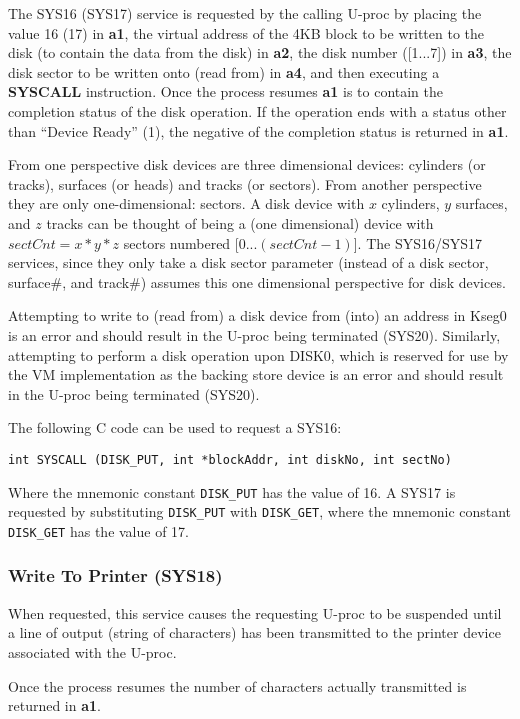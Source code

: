 The SYS16 (SYS17) service is requested by the calling U-proc by placing the value 16 (17) in \textbf{a1}, the virtual address of the 4KB block to be written to the disk (to contain the data from the disk) in \textbf{a2}, the disk number ([1...7]) in \textbf{a3}, the disk sector to be written onto (read from) in \textbf{a4}, and then executing a \textbf{SYSCALL} instruction. 
Once the process resumes \textbf{a1} is to contain the completion status of the disk operation. 
If the operation ends with a status other than ``Device Ready'' (1), the negative of the completion status is returned in \textbf{a1}.

From one perspective disk devices are three dimensional devices: cylinders (or tracks), surfaces (or heads) and tracks (or sectors). 
From another perspective they are only one-dimensional: sectors. 
A disk device with $x$ cylinders, $y$ surfaces, and $z$ tracks can be thought of being a (one dimensional) device with $sectCnt = x * y * z$ sectors numbered [0...$(sectCnt - 1)$]. 
The SYS16/SYS17 services, since they only take a disk sector parameter (instead of a disk sector, surface\#, and track\#) assumes this one dimensional perspective for disk devices.

Attempting to write to (read from) a disk device from (into) an address in Kseg0 is an error and should result in the U-proc being terminated (SYS20).
Similarly, attempting to perform a disk operation upon DISK0, which is reserved for use by the VM implementation as the backing store device is an error and should result in the U-proc being terminated (SYS20).

The following C code can be used to request a SYS16:
\begin{center}
\verb+int SYSCALL (DISK_PUT, int *blockAddr, int diskNo, int sectNo)+
\end{center}
Where the mnemonic constant \verb+DISK_PUT+ has the value of 16. A SYS17 is requested by substituting \verb+DISK_PUT+ with \verb+DISK_GET+, where the mnemonic constant \verb+DISK_GET+ has the value of 17.


\subsubsection{Write To Printer (SYS18)}
When requested, this service causes the requesting U-proc to be suspended until a line of output (string of characters) has been transmitted to the printer device associated with the U-proc.

Once the process resumes the number of characters actually transmitted is returned in \textbf{a1}.

